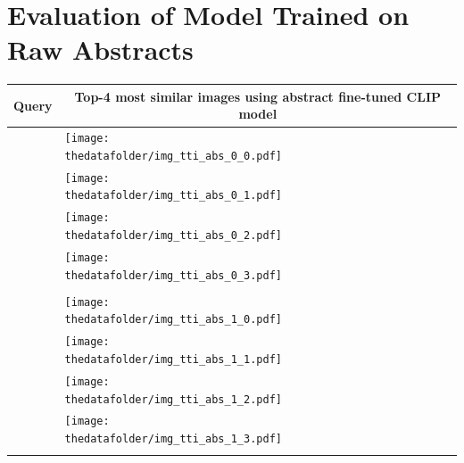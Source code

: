 \documentclass[10pt]{article} %
\begin{document}
\section{Evaluation of Model Trained on Raw Abstracts}
\label{app:eval_raw}



\begin{table}[h!]
  \centering
  \begin{tabular}{m{3cm} p{3cm} p{3cm} p{3cm} p{3cm}}
      \toprule
      \centering \bfseries Query & \multicolumn{4}{c}{\bfseries{Top-4 most similar images using \textcolor{deepblue}{abstract fine-tuned CLIP model}}} \tabularnewline
      \midrule
       \texttt{} \vspace{20mm} & \centering \texttt{[image: \\thedatafolder/img\_tti\_abs\_0\_0.pdf]} \\  & \centering \texttt{[image: \\thedatafolder/img\_tti\_abs\_0\_1.pdf]} \\  & \centering \texttt{[image: \\thedatafolder/img\_tti\_abs\_0\_2.pdf]} \\  & \centering \texttt{[image: \\thedatafolder/img\_tti\_abs\_0\_3.pdf]} \\   \tabularnewline
      \midrule
      \texttt{} \vspace{20mm} & \centering \texttt{[image: \\thedatafolder/img\_tti\_abs\_1\_0.pdf]} \\  & \centering \texttt{[image: \\thedatafolder/img\_tti\_abs\_1\_1.pdf]} \\  & \centering \texttt{[image: \\thedatafolder/img\_tti\_abs\_1\_2.pdf]} \\  & \centering \texttt{[image: \\thedatafolder/img\_tti\_abs\_1\_3.pdf]} \\   \tabularnewline
      \midrule

\end{tabular}
\end{table}
\end{document}
